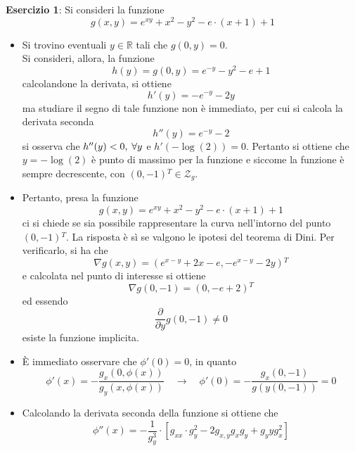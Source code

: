 \documentclass[a4paper]{extarticle}
\begin{document}
\vspace{2em}
\noindent
\textbf{Esercizio 1}: Si consideri la funzione
\[g(x,y) = e^{xy}+x^2-y^2-e \cdot (x+1) + 1\]
\begin{itemize}
    \item Si trovino eventuali $y \in \mathbb{R}$ tali che $g(0,y)=0$.\\
    Si consideri, allora, la funzione
    \[h(y)=g(0,y)=e^{-y}-y^2-e+1\]
    calcolandone la derivata, si ottiene
    \[h'(y) = -e^{-y}-2y\]
    ma studiare il segno di tale funzione non è immediato, per cui si calcola la derivata seconda
    \[h''(y) = e^{-y}-2\]
    si osserva che $h''(y)<0, \hspace{0.25em} \forall y$ e $h'(-\log(2))=0$. Pertanto si ottiene che $y=-\log(2)$ è punto di massimo per la funzione e siccome la funzione è sempre decrescente, con $(0,-1){^T} \in \mathcal{Z}_g$.

    \item Pertanto, presa la funzione
    \[g(x,y) = e^{xy}+x^2-y^2-e \cdot (x+1) + 1\]
    ci si chiede se sia possibile rappresentare la curva nell'intorno del punto $(0,-1){^T}$. La risposta è sì se valgono le ipotesi del teorema di Dini. Per verificarlo, si ha che
    \[\nabla g(x,y) = \left(e^{x-y}+2x-e,-e^{x-y}-2y\right){^T}\]
    e calcolata nel punto di interesse si ottiene
    \[\nabla g(0,-1) = \left(0,-e+2\right){^T}\]
    ed essendo
    \[\dfrac{\partial}{\partial y} g(0,-1) \neq 0\]
    esiste la funzione implicita.
    
    \item È immediato osservare che $\phi'(0)=0$, in quanto
    \[\phi'(x)=-\dfrac{g_x(0,\phi(x))}{g_y(x,\phi(x))} \hspace{1em} \rightarrow \hspace{1em} \phi'(0) = - \dfrac{g_x(0,-1)}{g(y(0,-1))} = 0\]

    \item Calcolando la derivata seconda della funzione si ottiene che
    \[\phi''(x) = -\dfrac{1}{g_y^3} \cdot \left[g_{xx} \cdot g_y^2 - 2g_{x,y} g_x g_y + g_yy g_x^2\right]\]
\end{itemize}
\end{document}

